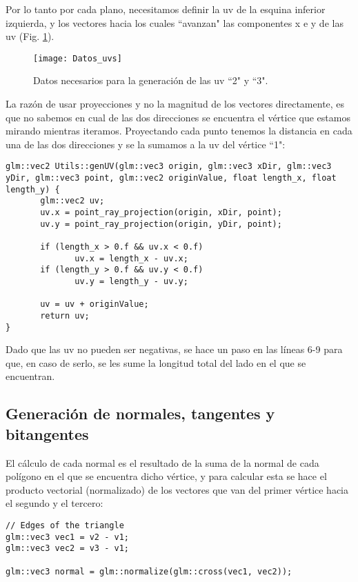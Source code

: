 Por lo tanto por cada plano, necesitamos definir la uv de la esquina inferior izquierda, y los vectores hacia los cuales ``avanzan" las componentes x e y de las uv (Fig. \ref{fig:datos_uvs}).

\begin{figure}[H]
    \centering
    \texttt{[image: Datos\_uvs]}
    \caption{Datos necesarios para la generación de las uv ``2" y ``3".}
    \label{fig:datos_uvs}
\end{figure}

La razón de usar proyecciones y no la magnitud de los vectores directamente, es que no sabemos en cual de las dos direcciones se encuentra el vértice que estamos mirando mientras iteramos. Proyectando cada punto tenemos la distancia en cada una de las dos direcciones y se la sumamos a la uv del vértice ``1":

\begin{lstlisting}
glm::vec2 Utils::genUV(glm::vec3 origin, glm::vec3 xDir, glm::vec3 yDir, glm::vec3 point, glm::vec2 originValue, float length_x, float length_y) {
       glm::vec2 uv;
       uv.x = point_ray_projection(origin, xDir, point);
       uv.y = point_ray_projection(origin, yDir, point);

       if (length_x > 0.f && uv.x < 0.f)
              uv.x = length_x - uv.x;
       if (length_y > 0.f && uv.y < 0.f)
              uv.y = length_y - uv.y;

       uv = uv + originValue;
       return uv;
}
\end{lstlisting}

Dado que las uv no pueden ser negativas, se hace un paso en las líneas 6-9 para que, en caso de serlo, se les sume la longitud total del lado en el que se encuentran.

\subsection{Generación de normales, tangentes y bitangentes}
El cálculo de cada normal es el resultado de la suma de la normal de cada polígono en el que se encuentra dicho vértice, y para calcular esta se hace el producto vectorial (normalizado) de los vectores que van del primer vértice hacia el segundo y el tercero:

\begin{lstlisting}
// Edges of the triangle
glm::vec3 vec1 = v2 - v1;
glm::vec3 vec2 = v3 - v1;

glm::vec3 normal = glm::normalize(glm::cross(vec1, vec2));
\end{lstlisting}

